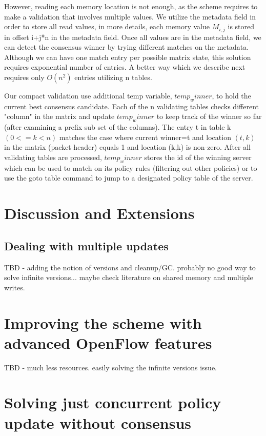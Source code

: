 \documentclass[conference]{sigcomm-alternate}
\begin{document}
However, reading each memory location is not enough, as the scheme requires to make a validation that involves multiple values. We utilize the metadata field in order to store all read values, in more details, each memory value $M_{i,j}$ is stored in offset i+j*n in the metadata field. Once all values are in the metadata field, we can detect the consensus winner by trying different matches on the metadata. Although we can have one match entry per possible matrix state, this solution requires exponential number of entries. A better way which we describe next requires only $O(n^2)$ entries utilizing n tables.

Our compact validation use additional temp variable, $temp_winner$, to hold the current best consensus candidate. Each of the n validating tables checks different "column" in the matrix and update $temp_winner$ to keep track of the winner so far (after examining a prefix sub set of the columns). The entry t in table k $(0<=k<n)$  matches the case where current winner=t and location $(t,k)$ in the matrix (packet header) equals 1 and location (k,k) is non-zero. After all validating tables are processed, $temp_winner$ stores the id of the winning server which can be used to match on its policy rules (filtering out other policies) or to use the goto table command to jump to a designated policy table of the server.


\section{Discussion and Extensions}\label{sec:extension}

\subsection{Dealing with multiple updates}

TBD - adding the notion of versions and cleanup/GC. probably no good way to solve infinite versions... maybe check literature on shared memory and multiple writes.


\section{Improving the scheme with advanced OpenFlow features}\label{sec:todo}

TBD - much less resources. easily solving the infinite versions issue.


\section{Solving just concurrent policy update without consensus}\label{sec:todo}
\end{document}
